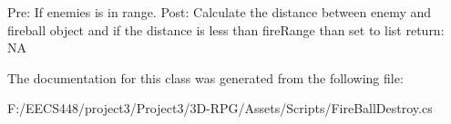 Pre\+: If enemies is in range. Post\+: Calculate the distance between enemy and fireball object and if the distance is less than fire\+Range than set to list return\+: NA 

The documentation for this class was generated from the following file\+:\begin{DoxyCompactItemize}
\item 
F\+:/\+E\+E\+C\+S448/project3/\+Project3/3\+D-\/\+R\+P\+G/\+Assets/\+Scripts/Fire\+Ball\+Destroy.\+cs\end{DoxyCompactItemize}
